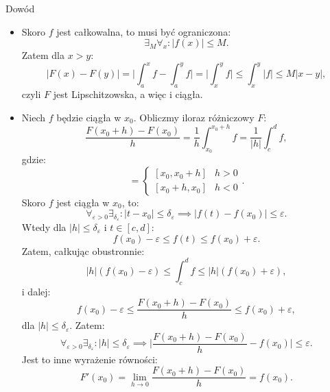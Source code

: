 \documentclass{article}
\numberwithin{defi}{section}
\numberwithin{defi}{section}
\providecommand{\eps}{\varepsilon}
\renewcommand{\leq}{\leqslant}
\begin{document}
\begin{dow}{Dowód}
    \begin{itemize}
        \item     Skoro $f$ jest całkowalna, to musi być ograniczona: \begin{equation*}
            \exists_M \forall_x: |f(x)| \leq M.
        \end{equation*} Zatem dla $ x > y$: \begin{equation}
            |F(x) - F(y)| = \big|\int_{a}^{x} f - \int_{a}^{y} f\big| = \big| \int_{x}^{y} f\big|\leq \int_{x}^{y} |f| \leq M |x - y|,
        \end{equation} czyli $F$ jest Lipschitzowska, a więc i ciągła.

        \item Niech $f$ będzie ciągła w $x_0$. Obliczmy iloraz różniczowy $F$:\begin{equation}
            \frac{F(x_0 + h) - F(x_0)}{h} = \frac{1}{h} \int_{x_0}^{x_0 + h} f = \frac{1}{|h|} \int_{c}^{d} f,
        \end{equation} gdzie: \begin{equation}
            [c, d] = \begin{cases}
                [x_0, x_0 + h] & h > 0 \\
                [x_0 + h, x_0] & h < 0
            \end{cases}.
        \end{equation}
        Skoro $f$ jest ciągła w $x_0$, to: \begin{equation}
            \forall_{\eps > 0} \exists_{\delta_\eps}: | t - x_0| \leq \delta_\eps \implies |f(t) - f(x_0)| \leq \eps. 
        \end{equation} Wtedy dla $|h| \leq \delta_\eps$ i $t \in [c, d]$: \begin{equation}
            f(x_0) - \eps \leq f(t) \leq f(x_0) + \eps.
        \end{equation} Zatem, całkując obustronnie: \begin{equation}
            |h| (f(x_0) - \eps) \leq  \int_{c}^{d} f \leq |h| (f(x_0) + \eps),
        \end{equation} i dalej: \begin{equation}
            f(x_0) - \eps \leq \frac{F(x_0 + h) - F(x_0)}{h} \leq f(x_0) + \eps,
        \end{equation} dla $|h| \leq \delta_\eps$. Zatem: \begin{equation}
            \forall_{\eps > 0} \exists_{\delta_\eps}: |h| \leq \delta_\eps \implies \big|  \frac{F(x_0 + h) - F(x_0)}{h} - f(x_0) \big| \leq \eps.
        \end{equation} Jest to inne wyrażenie równości: \begin{equation}
            F'(x_0) = \lim_{h \to 0} \frac{F(x_0 + h) - F(x_0)}{h} = f(x_0).
        \end{equation}
    \end{itemize}

\end{dow}
\end{document}
